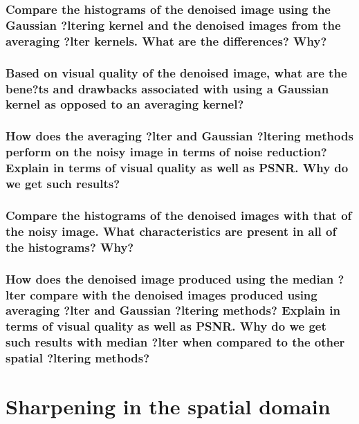 \documentclass[article, 1.5space, letterpaper, 12pt, oneside, header, footer]{SydeClass}
\begin{document}
\subsubsection{Compare the histograms of the denoised image using the Gaussian ?ltering kernel and the denoised
images from the averaging ?lter kernels. What are the differences? Why?}


\subsubsection{Based on visual quality of the denoised image, what are the bene?ts and drawbacks associated with
using a Gaussian kernel as opposed to an averaging kernel?}


\subsubsection{How does the averaging ?lter and Gaussian ?ltering methods perform on the noisy image in terms of
noise reduction? Explain in terms of visual quality as well as PSNR. Why do we get such results?}


\subsubsection{Compare the histograms of the denoised images with that of the noisy image. What characteristics
are present in all of the histograms? Why?}


\subsubsection{How does the denoised image produced using the median ?lter compare with the denoised images
produced using averaging ?lter and Gaussian ?ltering methods? Explain in terms of visual quality
as well as PSNR. Why do we get such results with median ?lter when compared to the other spatial
?ltering methods?}


\section{Sharpening in the spatial domain}
\end{document}
